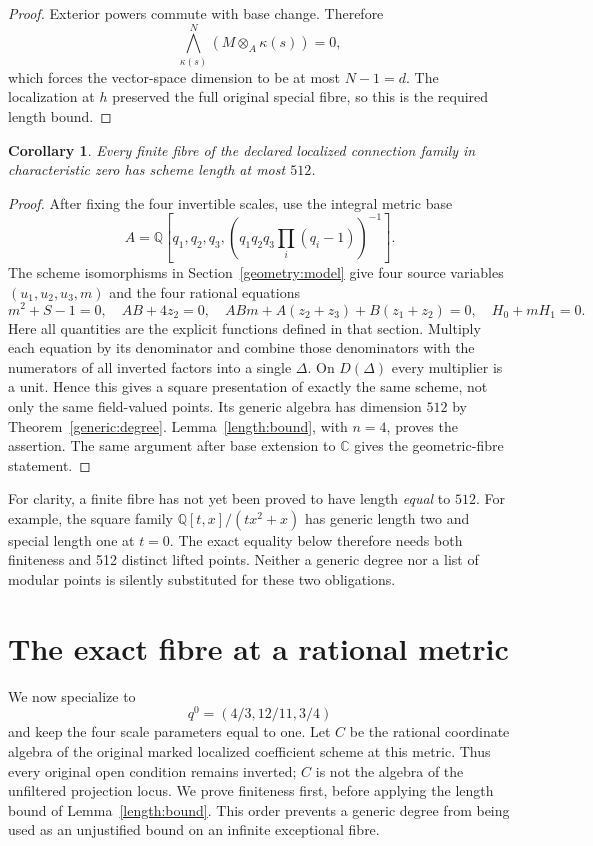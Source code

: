\documentclass[11pt,a4paper]{article}
\newtheorem{corollary}[theorem]{Corollary}\newtheorem{definition}[theorem]{Definition}
\theoremstyle{remark}\newtheorem{remark}[theorem]{Remark}
\begin{document}
\begin{proof}
Exterior powers commute with base change. Therefore
\[
 \bigwedge_{\kappa(s)}^N(M\otimes_A\kappa(s))=0,
\]
which forces the vector-space dimension to be at most $N-1=d$.
The localization at $h$ preserved the full original special fibre,
so this is the required length bound.
\end{proof}

\begin{corollary}\label{length:application}
Every finite fibre of the declared localized connection family in
characteristic zero has scheme length at most $512$.
\end{corollary}
\begin{proof}
After fixing the four invertible scales, use the integral metric base
\[
 A=\mathbb Q[q_1,q_2,q_3,(q_1q_2q_3\prod_i(q_i-1))^{-1}].
\]
The scheme isomorphisms in Section~\ref{geometry:model} give four source
variables $(u_1,u_2,u_3,m)$ and the four rational equations
\[
 m^2+S-1=0,\quad AB+4z_2=0,\quad
 ABm+A(z_2+z_3)+B(z_1+z_2)=0,\quad H_0+mH_1=0.
\]
Here all quantities are the explicit functions defined in that section.
Multiply each equation by its denominator and combine those denominators
with the numerators of all inverted factors into a single $\Delta$.
On $D(\Delta)$ every multiplier is a unit. Hence this gives a square
presentation of exactly the same scheme, not only the same field-valued
points. Its generic algebra has dimension $512$ by
Theorem~\ref{generic:degree}. Lemma~\ref{length:bound}, with $n=4$,
proves the assertion. The same argument after base extension to
$\mathbb C$ gives the geometric-fibre statement.
\end{proof}

For clarity, a finite fibre has not yet been proved to have length
\emph{equal} to $512$. For example, the square family
$\mathbb Q[t,x]/(tx^2+x)$ has generic length two and special length one
at $t=0$. The exact equality below therefore needs both finiteness and
512 distinct lifted points. Neither a generic degree nor a list of
modular points is silently substituted for these two obligations.

\section{The exact fibre at a rational metric}\label{centre:section}
We now specialize to
\[
 q^0=(4/3,12/11,3/4)
\]
and keep the four scale parameters equal to one. Let $C$ be the rational
coordinate algebra of the original marked localized coefficient scheme at
this metric. Thus every original open condition remains inverted; $C$ is
not the algebra of the unfiltered projection locus. We prove finiteness
first, before applying the length bound of Lemma~\ref{length:bound}. This
order prevents a generic degree from being used as an unjustified bound
on an infinite exceptional fibre.
\end{document}

